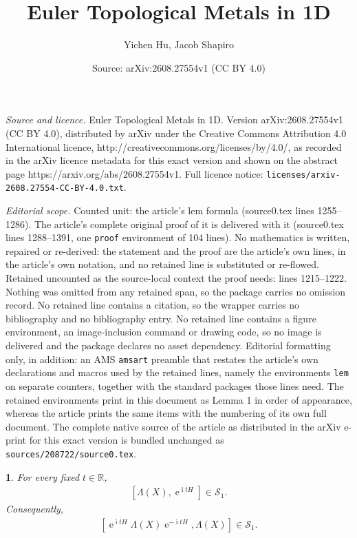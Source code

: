 \documentclass[10pt,a4paper]{amsart}
\title{Euler Topological Metals in 1D}
\author{Yichen Hu, Jacob Shapiro}
\date{Source: arXiv:2608.27554v1 (CC BY 4.0)}
\newtheorem{lem}{}
\newcommand{\RR}{\mathbb{R}}
\newcommand{\ee}{\operatorname{e}}
\newcommand{\eq}[1]{\begin{align*}#1\end{align*}}
\newcommand{\ii}{\operatorname{i}}
\begin{document}
\maketitle

\noindent\emph{Source and licence.} Euler Topological Metals in 1D. Version arXiv:2608.27554v1 (CC BY 4.0), distributed by arXiv under the Creative Commons Attribution 4.0 International licence, http://creativecommons.org/licenses/by/4.0/, as recorded in the arXiv licence metadata for this exact version and shown on the abstract page https://arxiv.org/abs/2608.27554v1. Full licence notice: \texttt{licenses/arxiv-2608.27554-CC-BY-4.0.txt}.\par\smallskip

\noindent\textit{Editorial scope.} Counted unit: the article's lem formula (source0.tex lines 1255--1286). The article's complete original proof of it is delivered with it (source0.tex lines 1288--1391, one \texttt{proof} environment of 104 lines). No mathematics is written, repaired or re-derived: the statement and the proof are the article's own lines, in the article's own notation, and no retained line is substituted or re-flowed.  Retained uncounted as the source-local context the proof needs: lines 1215--1222.  Nothing was omitted from any retained span, so the package carries no omission record.  No retained line contains a citation, so the wrapper carries no bibliography and no bibliography entry.  No retained line contains a figure environment, an image-inclusion command or drawing code, so no image is delivered and the package declares no asset dependency.  Editorial formatting only, in addition: an AMS \texttt{amsart} preamble that restates the article's own declarations and macros used by the retained lines, namely the environments \texttt{lem} on separate counters, together with the standard packages those lines need.  The retained environments print in this document as Lemma 1 in order of appearance, whereas the article prints the same items with the numbering of its own full document.  The complete native source of the article as distributed in the arXiv e-print for this exact version is bundled unchanged as \texttt{sources/208722/source0.tex}.
\begin{lem}\label{lem:lattice trace class}
For every fixed $t\in\RR$,
\eq{\left[\Lambda(X),\ee^{\ii tH}\right]\in\mathcal{S}_1.}
Consequently,
\eq{\left[
\ee^{\ii tH}\Lambda(X)\ee^{-\ii tH},\Lambda(X)
\right]\in\mathcal{S}_1.}
\end{lem}
\end{document}

